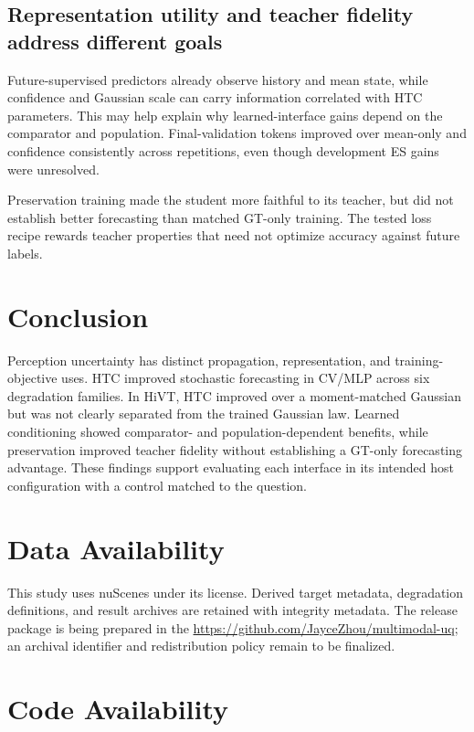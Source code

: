\documentclass[lettersize,journal]{IEEEtran}
\begin{document}
\subsection{Representation utility and teacher fidelity address different goals}
\label{subsec:section6-2}

Future-supervised predictors already observe history and mean state, while confidence and Gaussian scale can carry information correlated with HTC parameters. This may help explain why learned-interface gains depend on the comparator and population. Final-validation tokens improved over mean-only and confidence consistently across repetitions, even though development ES gains were unresolved.

Preservation training made the student more faithful to its teacher, but did not establish better forecasting than matched GT-only training. The tested loss recipe rewards teacher properties that need not optimize accuracy against future labels.

\section{Conclusion}
\label{sec:section7}

Perception uncertainty has distinct propagation, representation, and training-objective uses. HTC improved stochastic forecasting in CV/MLP across six degradation families. In HiVT, HTC improved over a moment-matched Gaussian but was not clearly separated from the trained Gaussian law. Learned conditioning showed comparator- and population-dependent benefits, while preservation improved teacher fidelity without establishing a GT-only forecasting advantage. These findings support evaluating each interface in its intended host configuration with a control matched to the question.

\section*{Data Availability}

This study uses nuScenes under its license. Derived target metadata, degradation definitions, and result archives are retained with integrity metadata. The release package is being prepared in the \url{https://github.com/JayceZhou/multimodal-uq}; an archival identifier and redistribution policy remain to be finalized.

\section*{Code Availability}
\end{document}
